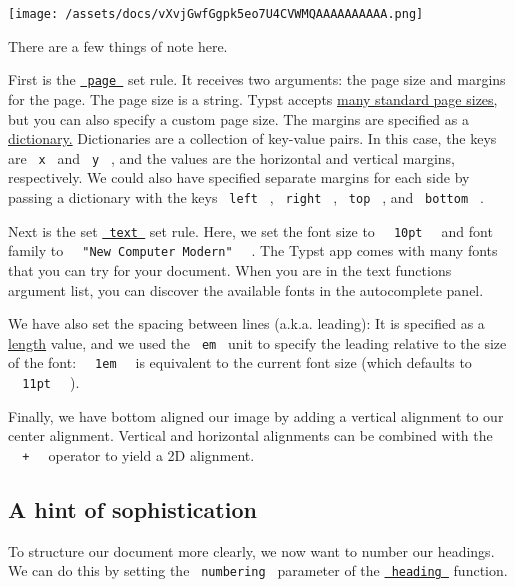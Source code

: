 \texttt{[image: /assets/docs/vXvjGwfGgpk5eo7U4CVWMQAAAAAAAAAA.png]}

There are a few things of note here.

First is the \href{/docs/reference/layout/page/}{\texttt{\ page\ }} set
rule. It receives two arguments: the page size and margins for the page.
The page size is a string. Typst accepts
\href{/docs/reference/layout/page/\#parameters-paper}{many standard page
sizes,} but you can also specify a custom page size. The margins are
specified as a
\href{/docs/reference/foundations/dictionary/}{dictionary.} Dictionaries
are a collection of key-value pairs. In this case, the keys are
\texttt{\ x\ } and \texttt{\ y\ } , and the values are the horizontal
and vertical margins, respectively. We could also have specified
separate margins for each side by passing a dictionary with the keys
\texttt{\ left\ } , \texttt{\ right\ } , \texttt{\ top\ } , and
\texttt{\ bottom\ } .

Next is the set \href{/docs/reference/text/text/}{\texttt{\ text\ }} set
rule. Here, we set the font size to
\texttt{\ }{\texttt{\ 10pt\ }}\texttt{\ } and font family to
\texttt{\ }{\texttt{\ "New\ Computer\ Modern"\ }}\texttt{\ } . The Typst
app comes with many fonts that you can try for your document. When you
are in the text function\textquotesingle s argument list, you can
discover the available fonts in the autocomplete panel.

We have also set the spacing between lines (a.k.a. leading): It is
specified as a \href{/docs/reference/layout/length/}{length} value, and
we used the \texttt{\ em\ } unit to specify the leading relative to the
size of the font: \texttt{\ }{\texttt{\ 1em\ }}\texttt{\ } is equivalent
to the current font size (which defaults to
\texttt{\ }{\texttt{\ 11pt\ }}\texttt{\ } ).

Finally, we have bottom aligned our image by adding a vertical alignment
to our center alignment. Vertical and horizontal alignments can be
combined with the \texttt{\ }{\texttt{\ +\ }}\texttt{\ } operator to
yield a 2D alignment.

\subsection{A hint of sophistication}\label{sophistication}

To structure our document more clearly, we now want to number our
headings. We can do this by setting the \texttt{\ numbering\ } parameter
of the \href{/docs/reference/model/heading/}{\texttt{\ heading\ }}
function.

